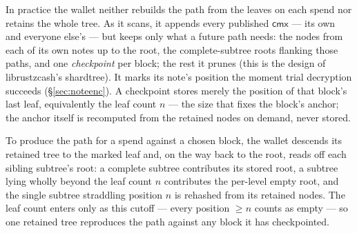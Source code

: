 \documentclass[11pt,a4paper]{article}
\theoremstyle{definition}
\newcommand{\cmx}{\mathsf{cmx}}
\begin{document}
In practice the wallet neither rebuilds the path from the leaves on each
spend nor retains the whole tree. As it scans, it appends every published
$\cmx$ --- its own and everyone else's --- but keeps only what a future path
needs: the nodes from each of its own notes up to the root, the
complete-subtree roots flanking those paths, and one \emph{checkpoint} per
block; the rest it prunes (this is the design of librustzcash's
\textsf{shardtree}). It marks its note's position the moment trial decryption
succeeds (\S\ref{sec:noteenc}). A checkpoint stores merely the position of
that block's last leaf, equivalently the leaf count $n$ --- the size that
fixes the block's anchor; the anchor itself is recomputed from the retained
nodes on demand, never stored.

To produce the path for a spend against a chosen block, the wallet descends
its retained tree to the marked leaf and, on the way back to the root, reads
off each sibling subtree's root: a complete subtree contributes its stored
root, a subtree lying wholly beyond the leaf count $n$ contributes the
per-level empty root, and the single subtree straddling position $n$ is
rehashed from its retained nodes. The leaf count enters only as this cutoff
--- every position $\ge n$ counts as empty --- so one retained tree
reproduces the path against any block it has checkpointed.
\end{document}
